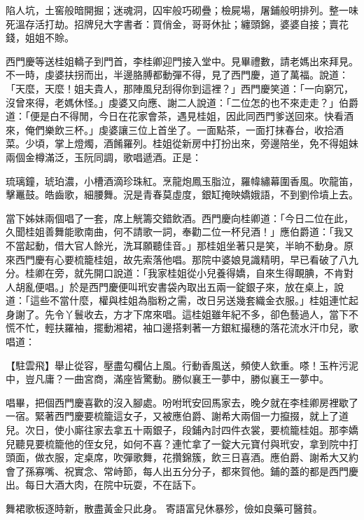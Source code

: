 \begin{showcontents}{}
陷人坑，土窖般暗開掘；迷魂洞，囚牢般巧砌疊；檢屍場，屠鋪般明排列。整一味死溫存活打劫。招牌兒大字書者：買俏金，哥哥休扯；纏頭錦，婆婆自接；賣花錢，姐姐不賒。

西門慶等送桂姐轎子到門首，李桂卿迎門接入堂中。見畢禮數，請老媽出來拜見。不一時，虔婆扶拐而出，半邊胳膊都動彈不得，見了西門慶，道了萬福。說道： 「天麼，天麼！姐夫貴人，那陣風兒刮得你到這裡？」西門慶笑道：「一向窮冗，沒曾來得，老媽休怪。」虔婆又向應、謝二人說道：「二位怎的也不來走走？」伯爵道：「便是白不得閒，今日在花家會茶，遇見桂姐，因此同西門爹送回來。快看酒來，俺們樂飲三杯。」虔婆讓三位上首坐了。一面點茶，一面打抹春台，收拾酒菜。少頃，掌上燈燭，酒餚羅列。桂姐從新房中打扮出來，旁邊陪坐，免不得姐妹兩個金樽滿泛，玉阮同調，歌唱遞酒。正是：

琉璃鐘，琥珀濃，小槽酒滴珍珠紅。烹龍炮鳳玉脂泣，羅幃繡幕圍香風。吹龍笛，擊鼉鼓。皓齒歌，細腰舞。況是青春莫虛度，銀缸掩映嬌娥語，不到劉伶墳上去。

當下姊妹兩個唱了一套，席上觥籌交錯飲酒。西門慶向桂卿道：「今日二位在此，久聞桂姐善舞能歌南曲，何不請歌一詞，奉勸二位一杯兒酒！」應伯爵道：「我又不當起動，借大官人餘光，洗耳願聽佳音。」那桂姐坐著只是笑，半晌不動身。原來西門慶有心要梳籠桂姐，故先索落他唱。那院中婆娘見識精明，早已看破了八九分。桂卿在旁，就先開口說道：「我家桂姐從小兒養得嬌，自來生得靦腆，不肯對人胡亂便唱。」於是西門慶便叫玳安書袋內取出五兩一錠銀子來，放在桌上，說道：「這些不當什麼，權與桂姐為脂粉之需，改日另送幾套織金衣服。」桂姐連忙起身謝了。先令丫鬟收去，方才下席來唱。這桂姐雖年紀不多，卻色藝過人，當下不慌不忙，輕扶羅袖，擺動湘裙，袖口邊搭剌著一方銀紅撮穗的落花流水汗巾兒，歌唱道：

【駐雲飛】舉止從容，壓盡勾欄佔上風。行動香風送，頻使人欽重。嗏！玉杵污泥中，豈凡庸？一曲宮商，滿座皆驚動。勝似襄王一夢中，勝似襄王一夢中。

唱畢，把個西門慶喜歡的沒入腳處。吩咐玳安回馬家去，晚夕就在李桂卿房裡歇了一宿。緊著西門慶要梳籠這女子，又被應伯爵、謝希大兩個一力攛掇，就上了道兒。次日，使小廝往家去拿五十兩銀子，段鋪內討四件衣裳，要梳籠桂姐。那李嬌兒聽見要梳籠他的侄女兒，如何不喜？連忙拿了一錠大元寶付與玳安，拿到院中打頭面，做衣服，定桌席，吹彈歌舞，花攢錦簇，飲三日喜酒。應伯爵、謝希大又約會了孫寡嘴、祝實念、常峙節，每人出五分分子，都來賀他。鋪的蓋的都是西門慶出。每日大酒大肉，在院中玩耍，不在話下。

舞裙歌板逐時新，散盡黃金只此身。
寄語富兒休暴殄，儉如良藥可醫貧。






\end{showcontents}




